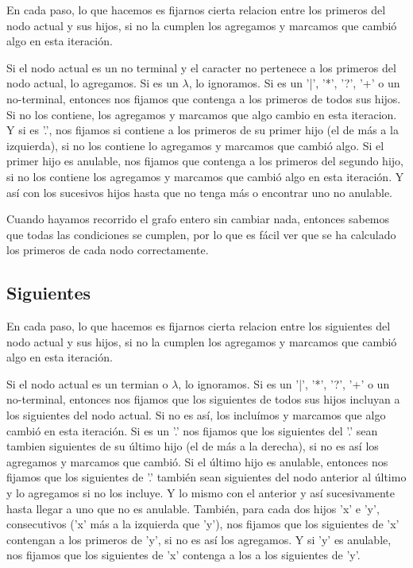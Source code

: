 \documentclass[a4paper]{report}
\begin{document}
	En cada paso, lo que hacemos es fijarnos cierta relacion entre los primeros
del nodo actual y sus hijos, si no la cumplen los agregamos y marcamos que
cambió algo en esta iteración.


	Si el nodo actual es un no terminal y el caracter no pertenece a los
primeros del nodo actual, lo agregamos. Si es un $\lambda$, lo ignoramos. Si es un
'|', '*', '?', '+' o un no-terminal, entonces nos fijamos que contenga a los
primeros de todos sus hijos. Si no los contiene, los agregamos y marcamos que
algo cambio en esta iteracion. Y si es '.', nos fijamos si contiene a los
primeros de su primer hijo (el de más a la izquierda), si no los contiene lo
agregamos y marcamos que cambió algo. Si el primer hijo es anulable, nos fijamos
que contenga a los primeros del segundo hijo, si no los contiene los agregamos y
marcamos que cambió algo en esta iteración. Y así con los sucesivos hijos hasta
que no tenga más o encontrar uno no anulable.


	Cuando hayamos recorrido el grafo entero sin cambiar nada, entonces
sabemos que todas las condiciones se cumplen, por lo que es fácil ver que se ha
calculado los primeros de cada nodo correctamente.


\subsection*{Siguientes}

	En cada paso, lo que hacemos es fijarnos cierta relacion entre los
siguientes del nodo actual y sus hijos, si no la cumplen los agregamos y marcamos que
cambió algo en esta iteración.


	Si el nodo actual es un termian o $\lambda$, lo ignoramos. Si es un '|',
'*', '?', '+' o un no-terminal, entonces nos fijamos que los siguientes de todos
sus hijos incluyan a los siguientes del nodo actual. Si no es así, los incluímos
y marcamos que algo cambió en esta iteración. Si es un '.' nos fijamos que los
siguientes del '.' sean tambien siguientes de su último hijo (el de más a la
derecha), si no es así los agregamos y marcamos que cambió. Si el último hijo es
anulable, entonces nos fijamos que los siguientes de '.' también sean siguientes
del nodo anterior al último y lo agregamos si no los incluye. Y lo mismo con el
anterior y así sucesivamente hasta llegar a uno que no es anulable. También,
para cada dos hijos 'x' e 'y', consecutivos ('x' más a la izquierda que 'y'),
nos fijamos que los siguientes de 'x' contengan a los primeros de 'y', si no es
así los agregamos. Y si 'y' es anulable, nos fijamos que los siguientes de 'x'
contenga a los a los siguientes de 'y'.
\end{document}
